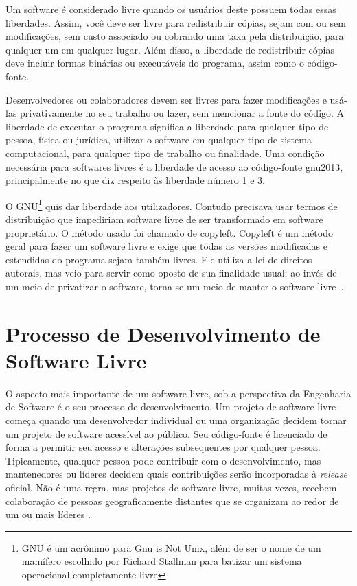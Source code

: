 Um software é considerado livre quando os usuários deste possuem todas essas liberdades. Assim, você deve ser livre para redistribuir cópias, sejam com ou sem modificações, sem custo associado ou cobrando uma taxa pela distribuição, para qualquer um em qualquer lugar. Além disso, a liberdade de redistribuir cópias deve incluir formas binárias ou executáveis do programa, assim como o código-fonte.

Desenvolvedores ou colaboradores devem ser livres para fazer modificações e usá-las privativamente no seu trabalho ou lazer, sem mencionar a fonte do código. A liberdade de executar o programa significa a liberdade para qualquer tipo de pessoa, física ou jurídica, utilizar o software em qualquer tipo de sistema computacional, para qualquer tipo de trabalho ou finalidade. Uma condição necessária para softwares livres é a liberdade de acesso ao código-fonte {gnu2013}, principalmente no que diz respeito às liberdade número 1 e 3.


%
O GNU\footnote{GNU é um acrônimo para Gnu is Not Unix, além de ser o nome de um mamífero escolhido por Richard Stallman para batizar um sistema operacional completamente livre} quis dar liberdade aos utilizadores. Contudo precisava usar termos de distribuição que impediriam software livre de ser transformado em software proprietário. O método usado foi chamado de copyleft. Copyleft é um método geral para fazer um software livre e exige que todas as versões modificadas e estendidas do programa sejam também livres. Ele utiliza a lei de direitos autorais, mas veio para servir como oposto de sua finalidade usual: ao invés de um meio de privatizar o software, torna-se um meio de manter o software livre~\cite{stallman2009}.

\section{Processo de Desenvolvimento de Software Livre}
\label{sec-proc-sl}

O aspecto mais importante de um software livre, sob a perspectiva da Engenharia de Software é o seu processo de desenvolvimento. Um projeto de software livre começa quando um desenvolvedor individual ou uma organização decidem tornar um projeto de software acessível ao público. Seu código-fonte é licenciado de forma a permitir seu acesso e alterações subsequentes por qualquer pessoa. Tipicamente, qualquer pessoa pode contribuir com o desenvolvimento, mas mantenedores ou líderes decidem quais contribuições serão incorporadas à \textit{release} oficial. Não é uma regra, mas projetos de software livre, muitas vezes, recebem colaboração de pessoas geograficamente distantes que se organizam ao redor de um ou mais líderes \cite{corbucci2011freemethods}. 

